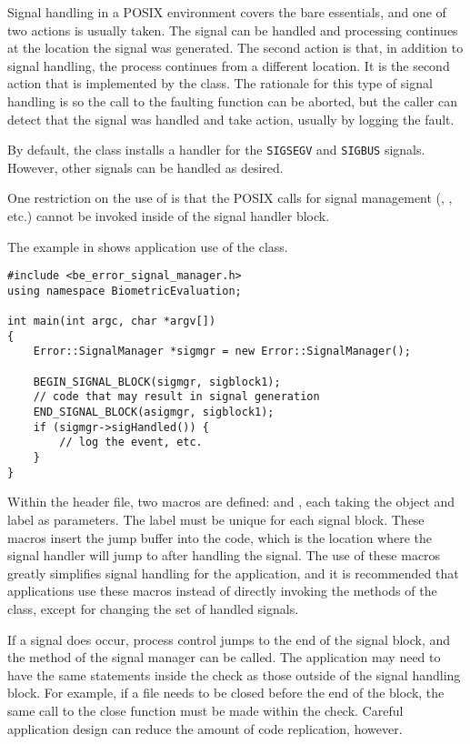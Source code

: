 Signal handling in a POSIX environment covers the bare essentials, and one of
two actions is usually taken. The signal can be handled and processing
continues at the location the signal was generated. The second action is
that, in addition to signal handling, the process continues from a different
location. It is the second action that is implemented by the
 class. The rationale for this type of signal handling is
so the call to the faulting function can be aborted, but the caller can
detect that the signal was handled and take action, usually by logging the
fault.

By default, the  class installs a handler for the
{\tt SIGSEGV} and {\tt SIGBUS} signals. However, other signals can be
handled as desired.

One restriction on the use of  is that the POSIX calls for
signal management (, , etc.) cannot be
invoked inside of the signal handler block.

The example in  shows application use of the
 class.

\begin{lstlisting}[caption={Using the \class{SignalManger}}, label=signalmanageruse]
#include <be_error_signal_manager.h>
using namespace BiometricEvaluation;

int main(int argc, char *argv[])
{
	Error::SignalManager *sigmgr = new Error::SignalManager();

	BEGIN_SIGNAL_BLOCK(sigmgr, sigblock1);
	// code that may result in signal generation
	END_SIGNAL_BLOCK(asigmgr, sigblock1);
	if (sigmgr->sigHandled()) {
		// log the event, etc.
	}
}
\end{lstlisting}

Within the  header file, two macros are defined:
 and , each taking the
 object and label as parameters. The label must be unique
for each signal block. These macros insert the
jump buffer into the code, which is the location where the signal handler will
jump to after handling the signal. The use of these macros greatly simplifies
signal handling for the application, and it is recommended that applications
use these macros instead of directly invoking the methods of the
 class, except for changing the set of handled signals.

If a signal does occur, process control jumps to the end of the signal block,
and the  method of the signal manager can be called. The
application may need to have the same statements inside the  check
as those outside of the signal handling block. For example, if a file needs
to be closed before the end of the block, the same call to the close function
must be made within the  check. Careful application design can
reduce the amount of code replication, however.

